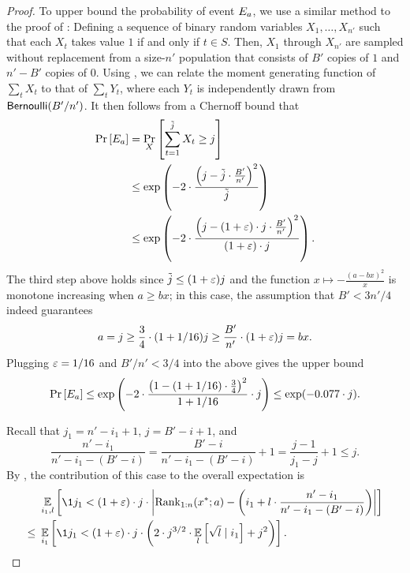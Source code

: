 \begin{proof}
To upper bound the probability of event $E_a$, we use a similar method to the proof of : Defining a sequence of binary random variables $X_1, \ldots, X_{n'}$ such that each $X_{t}$ takes value $1$ if and only if $t \in S$. Then, $X_1$ through $X_{n'}$ are sampled without replacement from a size-$n'$ population that consists of $B'$ copies of $1$ and $n' - B'$ copies of $0$. Using , we can relate the moment generating function of $\sum_t X_t$ to that of $\sum_t Y_t$, where each $Y_t$ is independently drawn from $\mathsf{Bernoulli}(B'/n')$. It then follows from a Chernoff bound that
\begin{align*}
        \Pr_{}\left[E_a\right]
&=      \Pr_{X}\left[\sum_{t=1}^{\tilde j}X_t \ge j\right]\\
&\le    \exp\left(-2\cdot\frac{\left(j - \tilde j\cdot\frac{B'}{n'}\right)^2}{\tilde j}\right)\\
&\le    \exp\left(-2\cdot\frac{\left(j - (1 + \varepsilon)\cdot j\cdot\frac{B'}{n'}\right)^2}{(1 + \varepsilon)\cdot j}\right).
\end{align*}
The third step above holds since $\tilde j \le (1 + \varepsilon)j$ and the function $x \mapsto -\frac{(a - bx)^2}{x}$ is monotone increasing when $a \ge bx$; in this case, the assumption that $B' < 3n'/4$ indeed guarantees
\[
    a
=   j
\ge \frac{3}{4}\cdot (1 + 1/16)j
\ge \frac{B'}{n'}\cdot (1 + \varepsilon)j
=   bx.
\]
Plugging $\varepsilon = 1 / 16$ and $B' / n' < 3/4$ into the above gives the upper bound
\[
    \Pr_{}\left[E_a\right]
\le \exp\left(-2\cdot\frac{\left(1 - (1 + 1/16)\cdot\frac{3}{4}\right)^2}{1 + 1/16}\cdot j\right)
\le \exp(-0.077\cdot j).
\]

Recall that $j_1 = n' - i_1 + 1$, $j = B' - i + 1$, and
\[
    \frac{n' - i_1}{n' - i_1 - (B' - i)}
=   \frac{B' - i}{n' - i_1 - (B' - i)} + 1
=   \frac{j - 1}{j_1 - j} + 1
\le j.
\]
By , the contribution of this case to the overall expectation is
\begin{align*}
    &~\Ex{i_1, l}{\1{j_1 < (1+\eps)\cdot j}\cdot\left|\rank_{{1:n}}(x^*; a) - \left(i_1+l\cdot \frac{n'-i_1}{n'-i_1-(B'-i)}\right)\right|}\\
    \le &~\Ex{i_1}{\1{j_1 < (1+\eps)\cdot j}\cdot\left(2\cdot j^{3/2}\cdot \Ex{l}{\sqrt{l}\mid i_1} + j^2\right)}.
\end{align*}


\end{proof}
